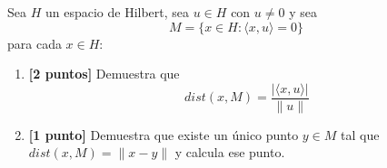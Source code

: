 \documentclass[12pt]{article}
\begin{document}
    \begin{ejercicio}[3 puntos]
        Sea $H$ un espacio de Hilbert, sea $u\in H$ con $u\neq 0$ y sea
        \begin{equation*}
            M = \{x\in H : \langle x,u \rangle =0\}
        \end{equation*}
        para cada $x\in H$:
        \begin{enumerate}[label=\alph*)]
            \item \textbf{[2 puntos]} Demuestra que
                \begin{equation*}
                    dist(x,M) = \frac{|\langle x,u \rangle |}{\|u\|}
                \end{equation*}
            \item \textbf{[1 punto]} Demuestra que existe un único punto $y\in M$ tal que $dist(x,M) = \|x-y\|$ y calcula ese punto.
        \end{enumerate}
    \end{ejercicio}


    \newpage
    \setcounter{ejercicio}{0} %
\end{document}
